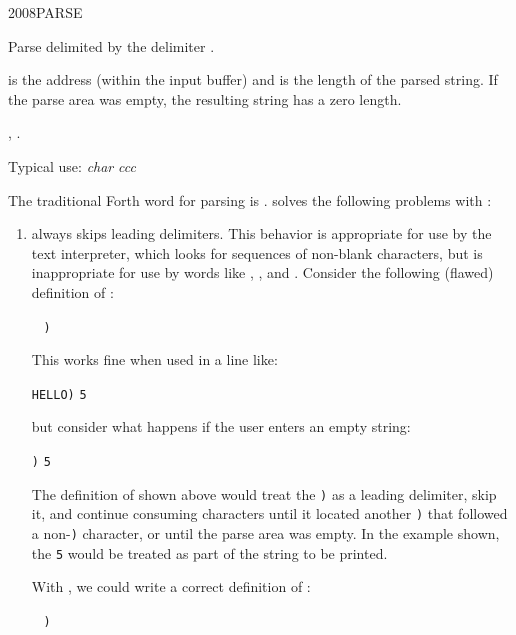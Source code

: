 \begin{worddef}{2008}{PARSE}
\item {}

	Parse  delimited by the delimiter .

	 is the address (within the input buffer) and
	 is the length of the parsed string. If the parse area
	was empty, the resulting string has a zero length.

\see {},
	.

	\begin{rationale} %
		Typical use: \emph{char}  \emph{ccc}

		The traditional Forth word for parsing is .
		 solves the following problems with :

		\begin{enumerate}
		\item {} always skips leading delimiters. This
			behavior is appropriate for use by the text interpreter,
			which looks for sequences of non-blank characters, but is
			inappropriate for use by words like  , ,
			and . Consider the following (flawed) definition
			of :

			\tab \word{:}  ~
				\word{[CHAR]} \texttt{)} ~
				  
			\word{;} ~ 

			This works fine when used in a line like:

			\tab {} \texttt{HELLO)} \quad \texttt{5} 

			but consider what happens if the user enters an empty
			string:

			\tab {} \texttt{)} \quad \texttt{5} 

			The definition of  shown above would treat the
			\texttt{)} as a leading delimiter, skip it, and continue
			consuming characters until it located another \texttt{)}
			that followed a non-\texttt{)} character, or until the
			parse area was empty. In the example shown, the
			\texttt{5} 
			would be treated as part of the string to be printed.

			With , we could write a correct definition of
			:

			\tab \word{:}  ~
				\word{[CHAR]} \texttt{)} ~
				 
			\word{;} ~ 


\end{enumerate}
\end{rationale}
\end{worddef}
